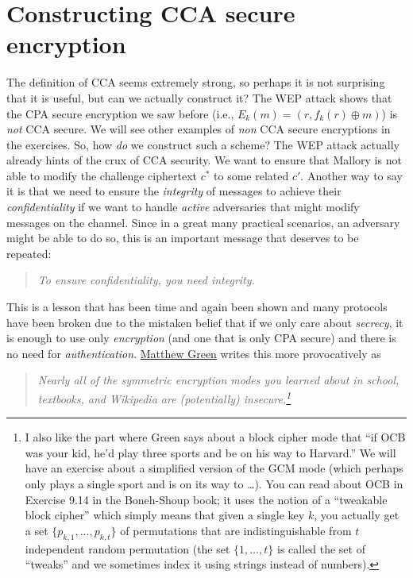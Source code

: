 \section{Constructing CCA secure
encryption}\label{6-Constructing-CCA-secur}

The definition of CCA seems extremely strong, so perhaps it is not
surprising that it is useful, but can we actually construct it? The WEP
attack shows that the CPA secure encryption we saw before (i.e.,
\(E_k(m)=(r,f_k(r)\oplus m)\)) is \emph{not} CCA secure. We will see
other examples of \emph{non} CCA secure encryptions in the exercises.
So, how \emph{do} we construct such a scheme? The WEP attack actually
already hints of the crux of CCA security. We want to ensure that
Mallory is not able to modify the challenge ciphertext \(c^*\) to some
related \(c'\). Another way to say it is that we need to ensure the
\emph{integrity} of messages to achieve their \emph{confidentiality} if
we want to handle \emph{active} adversaries that might modify messages
on the channel. Since in a great many practical scenarios, an adversary
might be able to do so, this is an important message that deserves to be
repeated:

\begin{quote}
\emph{To ensure confidentiality, you need integrity.}
\end{quote}

This is a lesson that has been time and again been shown and many
protocols have been broken due to the mistaken belief that if we only
care about \emph{secrecy}, it is enough to use only \emph{encryption}
(and one that is only CPA secure) and there is no need for
\emph{authentication}.
\href{http://blog.cryptographyengineering.com/2012/05/how-to-choose-authenticated-encryption.html}{Matthew
Green} writes this more provocatively as

\begin{quote}
\emph{Nearly all of the symmetric encryption modes you learned about in
school, textbooks, and Wikipedia are (potentially) insecure.\footnote{I
  also like the part where Green says about a block cipher mode that
  ``if OCB was your kid, he'd play three sports and be on his way to
  Harvard.'' We will have an exercise about a simplified version of the
  GCM mode (which perhaps only plays a single sport and is on its way to
  \ldots). You can read about OCB in Exercise 9.14 in the Boneh-Shoup
  book; it uses the notion of a ``tweakable block cipher'' which simply
  means that given a single key \(k\), you actually get a set
  \(\{ p_{k,1},\ldots,p_{k,t} \}\) of permutations that are
  indistinguishable from \(t\) independent random permutation (the set
  \(\{1,\ldots, t\}\) is called the set of ``tweaks'' and we sometimes
  index it using strings instead of numbers).}}
\end{quote}

